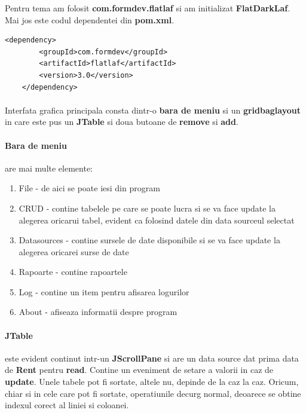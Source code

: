 \documentclass[oneside]{article}
\begin{document}
Pentru tema am folosit \textbf{com.formdev.flatlaf} si am initializat \textbf{FlatDarkLaf}. Mai jos este codul dependentei din \textbf{pom.xml}.
\begin{center}
    \begin{lstlisting}[language=pom]
    <dependency>
        <groupId>com.formdev</groupId>
        <artifactId>flatlaf</artifactId>
        <version>3.0</version>
    </dependency>
    \end{lstlisting}
\end{center}

\paragraph{} Interfata grafica principala consta dintr-o \textbf{bara de meniu} si un \textbf{gridbaglayout} in care este pus un \textbf{JTable} si doua butoane de \textbf{remove} si \textbf{add}.

\paragraph{Bara de meniu} are mai multe elemente:
\begin{enumerate}
    \item File - de aici se poate iesi din program
    \item CRUD - contine tabelele pe care se poate lucra si se va face update la alegerea oricarui tabel, evident ca folosind datele din data sourceul selectat
    \item Datasources - contine sursele de date disponibile si se va face update la alegerea oricarei surse de date
    \item Rapoarte - contine rapoartele
    \item Log - contine un item pentru afisarea logurilor
    \item About - afiseaza informatii despre program
\end{enumerate}

\paragraph{JTable} este evident continut intr-un \textbf{JScrollPane} si are un data source dat prima data de \textbf{Rent} pentru \textbf{read}. Contine un eveniment de setare a valorii in caz de \textbf{update}. Unele tabele pot fi sortate, altele nu, depinde de la caz la caz. Oricum, chiar si in cele care pot fi  sortate, operatiunile decurg normal, deoarece se obtine indexul corect al liniei si coloanei.
\end{document}
